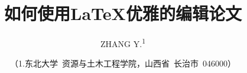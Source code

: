 \newif\ifShowCover %
\newif\ifShowTOC %
\newif\ifShowCnAbstract %
\newif\ifShowEnAbstract %
\newif\ifShowBibliography %
\newif\ifShowAppendix %
\newif\ifSetionIndex %

\ShowCovertrue %
\ShowTOCtrue %
\ShowCnAbstracttrue %
\ShowEnAbstracttrue %
\ShowBibliographytrue %
\ShowAppendixtrue %

\newcommand{\CourseName}{XXXXX} %
\newcommand{\TeacherName}{XX} %
\newcommand{\ReportType}{实\quad 验\quad 报\quad 告} %
\newcommand{\ReportNameCn}{如何使用{\LaTeX}优雅的编辑论文} %
\newcommand{\ReportNameEn}{How to Use {\LaTeX} Elegantly to Edit a Paper} %

\newcommand{\SchoolName}{东北大学资源与土木工程学院} %
\newcommand{\StudentMajor}{测绘工程} %
\newcommand{\StudentClass}{测绘2301班} %
\newcommand{\StudentID}{20232411} %
\newcommand{\StudentName}{张\quad 洋} %
\newcommand{\StudentAffiliationCn}{（1.东北大学\ 资源与土木工程学院，山西省\ 长治市\ 046000）} %
\newcommand{\StudentNameEn}{ZHANG Y.\textsuperscript{1}} %
\newcommand{\StudentAffiliationEn}{(1.Northeastern University, School of Resources and Civil Engineering, Shanxi, Changzhi, 046000, China)} %

\title{\heiti {} \ReportNameCn} %
\author{\kaishu {} \StudentNameEn} %
\date{{\kaishu {} \StudentAffiliationCn}} %